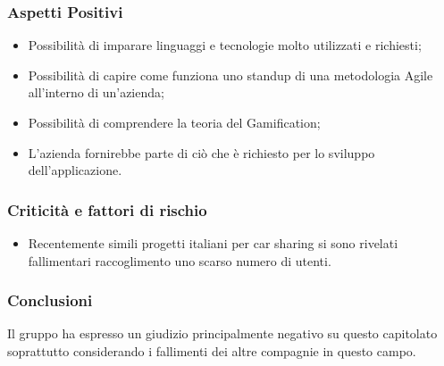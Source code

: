 \subsubsection{Aspetti Positivi}
\begin{itemize}
	\item Possibilità di imparare linguaggi e tecnologie molto utilizzati e richiesti;
	\item Possibilità di capire come funziona uno standup di una metodologia Agile all'interno di un'azienda;
	\item Possibilità di comprendere la teoria del Gamification;
	\item L'azienda fornirebbe parte di ciò che è richiesto per lo sviluppo dell'applicazione.

\end{itemize}

\subsubsection{Criticità e fattori di rischio}
\begin{itemize}
	\item Recentemente simili progetti italiani per car sharing si sono rivelati fallimentari raccoglimento uno scarso numero di utenti.
\end{itemize}
\subsubsection{Conclusioni}
Il gruppo ha espresso un giudizio principalmente negativo su questo capitolato soprattutto considerando i fallimenti dei altre compagnie in questo campo.